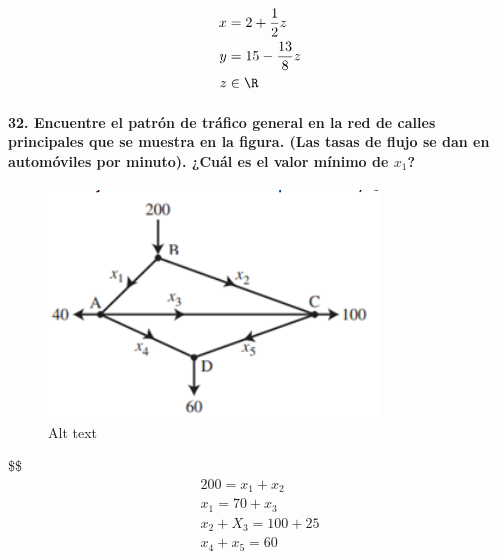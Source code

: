 \documentclass[
]{article}
\begin{document}
\[
\begin{align*}
    x&=2+\frac{1}{2}z\\
    y &= 15 - \frac{13}{8}z\\
    z &\in \R
\end{align*}
\]

\hypertarget{encuentre-el-patruxf3n-de-truxe1fico-general-en-la-red-de-calles-principales-que-se-muestra-en-la-figura.-las-tasas-de-flujo-se-dan-en-automuxf3viles-por-minuto.-cuuxe1l-es-el-valor-muxednimo-de-x_1}{%
\paragraph{\texorpdfstring{32. Encuentre el patrón de tráfico general en
la red de calles principales que se muestra en la figura. (Las tasas de
flujo se dan en automóviles por minuto). ¿Cuál es el valor mínimo de
\(x_1\)?}{32. Encuentre el patrón de tráfico general en la red de calles principales que se muestra en la figura. (Las tasas de flujo se dan en automóviles por minuto). ¿Cuál es el valor mínimo de x\_1?}}\label{encuentre-el-patruxf3n-de-truxe1fico-general-en-la-red-de-calles-principales-que-se-muestra-en-la-figura.-las-tasas-de-flujo-se-dan-en-automuxf3viles-por-minuto.-cuuxe1l-es-el-valor-muxednimo-de-x_1}}

\begin{figure}
\centering
\includegraphics{image.png}
\caption{Alt text}
\end{figure}

\$\$ \begin{align*}
    200 = x_1 + x_2\\
    x_1 = 70 + x_3\\
    x_2 + X_3 = 100+25\\
    x_4 + x_5 = 60
\end{align*}

\rightarrow

\end{document}
